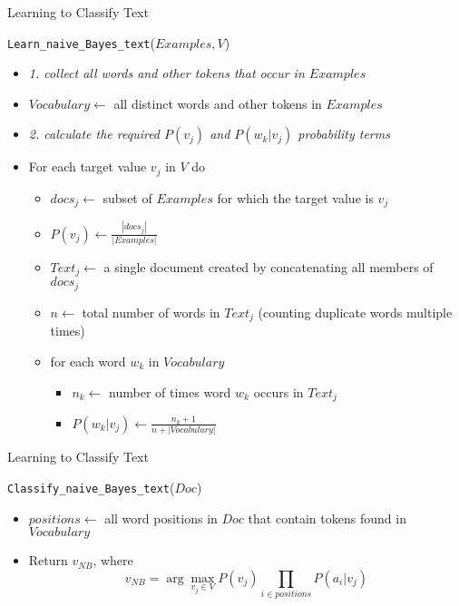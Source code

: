 \documentclass[%
pdf,
colorBG,
slideColor,
tcrico,
]{prosper}
\begin{document}
\begin{slide}{Learning to Classify Text }  
\tiny

\texttt{Learn\_naive\_Bayes\_text}($Examples, V$)
\begin{itemize}

\item[]
{\em 1. collect all words and other tokens that occur in $Examples$}

\item $Vocabulary \gets$ all distinct words and other tokens in $Examples$

\item[]
{\em 2. calculate the required $P(v_{j})$ and $P(w_{k}|v_{j})$ probability
terms}

\item
For each target value $v_{j}$ in $V$ do
\begin{itemize}
\item
$docs_{j} \gets $ subset of $Examples$ for which the target value is $v_{j}$

\item
$P(v_{j}) \gets \frac{|docs_{j}|}{|Examples|}$

\item
$Text_{j} \gets $ a single document created by concatenating all members of $docs_{j}$

\item
$n \gets$ total number of words in $Text_{j}$ (counting duplicate words multiple
times)

\item
for each word $w_{k}$ in $Vocabulary$
\begin{itemize}
\item
$n_{k} \gets$ number of times word $w_{k}$ occurs in $Text_{j}$

\item
$P(w_{k}|v_{j}) \gets \frac{n_{k} + 1}{n + |Vocabulary|}$
\end{itemize}
\end{itemize}
\end{itemize}
\end{slide}


\begin{slide}{Learning to Classify Text }  

\texttt{Classify\_naive\_Bayes\_text}($Doc$)

\begin{itemize}
\item $positions \gets$ all word positions in $Doc$ that contain tokens found in
$Vocabulary$

\item  Return $v_{NB}$, where
\[v_{NB} = \arg\max_{v_{j} \in V} P(v_{j}) \prod_{i \in positions}P(a_{i}|v_{j}) \]
\end{itemize}
\end{slide}
\end{document}
